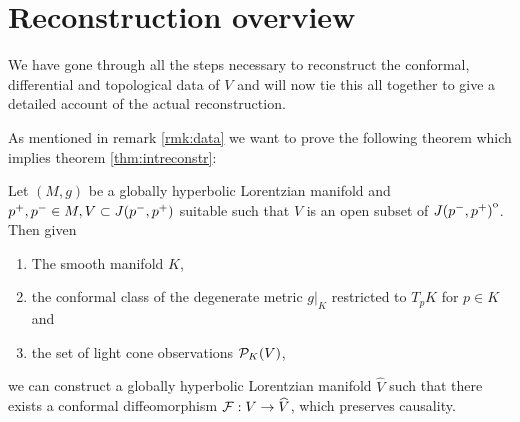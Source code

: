 \section{Reconstruction overview}
We have gone through all the steps necessary to reconstruct the conformal, differential and topological data of $V$ and will now tie this all together to give a detailed account of the actual reconstruction.

As mentioned in remark \ref{rmk:data} we want to prove the following theorem which implies theorem \ref{thm:intreconstr}:
\begin{theorem}
    Let $(M,g)$ be a globally hyperbolic Lorentzian manifold and $p^+,p^-\in M, V\subset J(p^-,p^+)$ suitable such that $V$ is an open subset of ${\kern0ptJ(p^-,p^+)}^{\mathrm{o}}$. Then given 
    \begin{enumerate}[label={\textnormal{(\arabic*)}}]
        \item The smooth manifold $K$,
        \item the conformal class of the degenerate metric $g\rvert_K$ restricted to $T_pK$ for $p\in K$ and
        \item the set of light cone observations ${\mathcal{P}}_K(V)$,
    \end{enumerate}
    we can construct a globally hyperbolic Lorentzian manifold $\widehat{V}$ such that there exists a conformal diffeomorphism $\mathcal{F}:V\to \widehat{V}$, which preserves causality.
\end{theorem}
